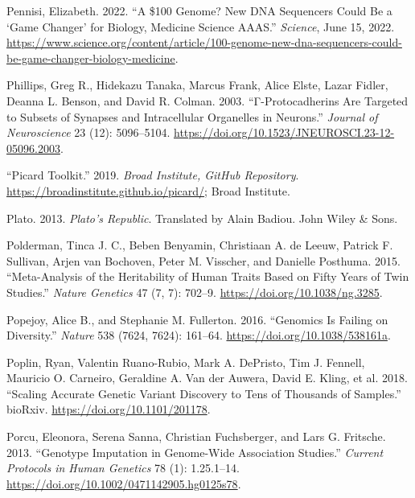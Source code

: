 \documentclass[
]{book}
\newlength{\cslhangindent}
\newlength{\cslentryspacingunit} %
\newenvironment{CSLReferences}[2] %
 {%
  \setlength{\parindent}{0pt}
  \ifodd #1
  \let\oldpar\par
  \def\par{\hangindent=\cslhangindent\oldpar}
  \fi
  \setlength{\parskip}{#2\cslentryspacingunit}
 }%
 {}
\begin{document}
\begin{CSLReferences}{1}{0}
\leavevmode{}%
Pennisi, Elizabeth. 2022. {``A \$100 Genome? {New DNA} Sequencers Could Be a {`Game Changer'} for Biology, Medicine \textbar{} {Science} \textbar{} {AAAS}.''} \emph{Science}, June 15, 2022. \url{https://www.science.org/content/article/100-genome-new-dna-sequencers-could-be-game-changer-biology-medicine}.

\leavevmode{}%
Phillips, Greg R., Hidekazu Tanaka, Marcus Frank, Alice Elste, Lazar Fidler, Deanna L. Benson, and David R. Colman. 2003. {``Γ-{Protocadherins Are Targeted} to {Subsets} of {Synapses} and {Intracellular Organelles} in {Neurons}.''} \emph{Journal of Neuroscience} 23 (12): 5096--5104. \url{https://doi.org/10.1523/JNEUROSCI.23-12-05096.2003}.

\leavevmode{}%
{``Picard Toolkit.''} 2019. \emph{Broad Institute, GitHub Repository}. \url{https://broadinstitute.github.io/picard/}; Broad Institute.

\leavevmode{}%
Plato. 2013. \emph{Plato's {Republic}}. Translated by Alain Badiou. {John Wiley \& Sons}.

\leavevmode{}%
Polderman, Tinca J. C., Beben Benyamin, Christiaan A. de Leeuw, Patrick F. Sullivan, Arjen van Bochoven, Peter M. Visscher, and Danielle Posthuma. 2015. {``Meta-Analysis of the Heritability of Human Traits Based on Fifty Years of Twin Studies.''} \emph{Nature Genetics} 47 (7, 7): 702--9. \url{https://doi.org/10.1038/ng.3285}.

\leavevmode{}%
Popejoy, Alice B., and Stephanie M. Fullerton. 2016. {``Genomics Is Failing on Diversity.''} \emph{Nature} 538 (7624, 7624): 161--64. \url{https://doi.org/10.1038/538161a}.

\leavevmode{}%
Poplin, Ryan, Valentin Ruano-Rubio, Mark A. DePristo, Tim J. Fennell, Mauricio O. Carneiro, Geraldine A. Van der Auwera, David E. Kling, et al. 2018. {``Scaling Accurate Genetic Variant Discovery to Tens of Thousands of Samples.''} {bioRxiv}. \url{https://doi.org/10.1101/201178}.

\leavevmode{}%
Porcu, Eleonora, Serena Sanna, Christian Fuchsberger, and Lars G. Fritsche. 2013. {``Genotype {Imputation} in {Genome-Wide Association Studies}.''} \emph{Current Protocols in Human Genetics} 78 (1): 1.25.1--14. \url{https://doi.org/10.1002/0471142905.hg0125s78}.


\end{CSLReferences}
\end{document}
